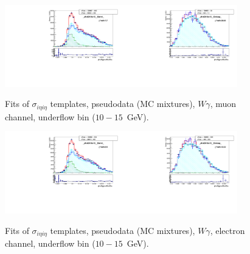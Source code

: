 \begin{figure}[htb]
  \begin{center}
   \includegraphics[width=0.45\textwidth]{../figs/figs_v11/MUON_WGamma/TemplateFits/c_TEMPL_SIHIH_UNblind__phoEt10to15__Barrel__RooFit_MCclosure.pdf}\includegraphics[width=0.45\textwidth]{../figs/figs_v11/MUON_WGamma/TemplateFits/c_TEMPL_SIHIH_UNblind__phoEt10to15__Endcap__RooFit_MCclosure.pdf}\\
  \label{fig:templateFits_MCclosure_SIHIH_MUON_0}
  \caption{Fits of $\sigma_{i \eta i \eta}$ templates, pseudodata (MC mixtures), $W\gamma$, muon channel, underflow bin ($10-15$~GeV).}
  \end{center}
\end{figure}

\begin{figure}[htb]
  \begin{center}
   \includegraphics[width=0.45\textwidth]{../figs/figs_v11/ELECTRON_WGamma/TemplateFits/c_TEMPL_SIHIH_UNblind__phoEt10to15__Barrel__RooFit_MCclosure.pdf}\includegraphics[width=0.45\textwidth]{../figs/figs_v11/ELECTRON_WGamma/TemplateFits/c_TEMPL_SIHIH_UNblind__phoEt10to15__Endcap__RooFit_MCclosure.pdf}\\
  \label{fig:templateFits_MCclosure_SIHIH_ELECTRON_0}
  \caption{Fits of $\sigma_{i \eta i \eta}$ templates, pseudodata (MC mixtures), $W\gamma$, electron channel, underflow bin ($10-15$~GeV).}
  \end{center}
\end{figure}

